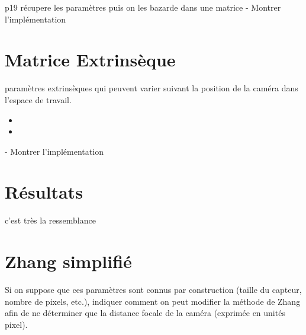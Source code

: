 \documentclass{article}
\begin{document}
p19 récupere les paramètres puis on les bazarde dans une matrice
- Montrer l'implémentation



\section{Matrice Extrinsèque}
paramètres extrinsèques qui peuvent varier suivant la position de la caméra dans l'espace de travail.
\begin{itemize}
\item %
\item %
\end{itemize}
- Montrer l'implémentation


\section{Résultats}

c'est très la ressemblance


\section{Zhang simplifié}

Si on suppose que ces paramètres sont connus par construction (taille du capteur, nombre de pixels, etc.), indiquer comment on peut modifier la méthode de Zhang afin de ne déterminer que la distance focale de la caméra (exprimée en unités pixel).
\end{document}
